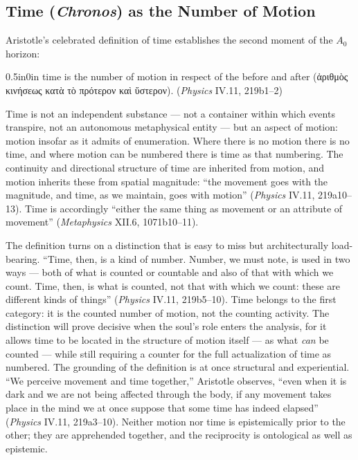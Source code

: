 \documentclass{article}
\newcommand{\gk}[1]{{\greekfont #1}}
\begin{document}
\subsection{Time (\textit{Chronos}) as the Number of Motion}

Aristotle's celebrated definition of time establishes the second moment of the $A_0$ horizon:
\begin{adjustwidth}{0.5in}{0in}
time is the number of motion in respect of the before and after (\gk{ἀριθμὸς κινήσεως κατὰ τὸ πρότερον καὶ ὕστερον}). (\textit{Physics} IV.11, 219b1--2)
\end{adjustwidth}
Time is not an independent substance --- not a container within which events transpire, not an autonomous metaphysical entity --- but an aspect of motion: motion insofar as it admits of enumeration. Where there is no motion there is no time, and where motion can be numbered there is time as that numbering. The continuity and directional structure of time are inherited from motion, and motion inherits these from spatial magnitude: ``the movement goes with the magnitude, and time, as we maintain, goes with motion'' (\textit{Physics} IV.11, 219a10--13). Time is accordingly ``either the same thing as movement or an attribute of movement'' (\textit{Metaphysics} XII.6, 1071b10--11).

The definition turns on a distinction that is easy to miss but architecturally load-bearing. ``Time, then, is a kind of number. Number, we must note, is used in two ways --- both of what is counted or countable and also of that with which we count. Time, then, is what is counted, not that with which we count: these are different kinds of things'' (\textit{Physics} IV.11, 219b5--10). Time belongs to the first category: it is the counted number of motion, not the counting activity. The distinction will prove decisive when the soul's role enters the analysis, for it allows time to be located in the structure of motion itself --- as what \textit{can} be counted --- while still requiring a counter for the full actualization of time as numbered. The grounding of the definition is at once structural and experiential. ``We perceive movement and time together,'' Aristotle observes, ``even when it is dark and we are not being affected through the body, if any movement takes place in the mind we at once suppose that some time has indeed elapsed'' (\textit{Physics} IV.11, 219a3--10). Neither motion nor time is epistemically prior to the other; they are apprehended together, and the reciprocity is ontological as well as epistemic.
\end{document}
